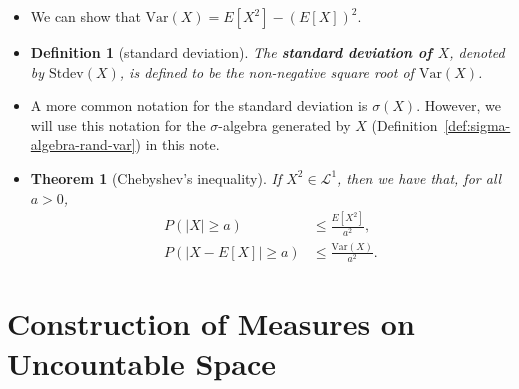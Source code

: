 \documentclass[10pt]{article}
\newtheorem{theorem}[lemma]{Theorem}
\newtheorem{definition}[lemma]{Definition}
\numberwithin{lemma}{section}
\newcommand{\Var}{\mathrm{Var}}
\newcommand{\Stdev}{\mathrm{Stdev}}
\newcommand{\mcal}[1]{\mathcal{#1}}
\begin{document}
\begin{itemize}
  \item We can show that $\Var(X) = E[X^2] - (E[X])^2$.

  \item \begin{definition}[standard deviation]
    The {\bf standard deviation of $X$}, denoted by $\Stdev(X)$, is defined to be the non-negative square root of $\Var(X)$.
  \end{definition}

  \item A more common notation for the standard deviation is $\sigma(X)$. However, we will use this notation for the $\sigma$-algebra generated by $X$ (Definition~\ref{def:sigma-algebra-rand-var}) in this note.

  \item \begin{theorem}[Chebyshev's inequality]
    If $X^2 \in \mcal{L}^1$, then we have that, for all $a > 0$,
    \begin{align*}
      P(|X| \geq a) &\leq \frac{E[X^2]}{a^2}, \\
      P(|X - E[X]| \geq a) &\leq \frac{\Var(X)}{a^2}.
    \end{align*}
  \end{theorem}
\end{itemize}

\section{Construction of Measures on Uncountable Space}
\end{document}
